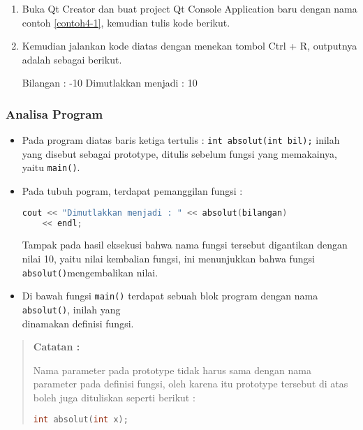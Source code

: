 \begin{enumerate}

\item
  Buka Qt Creator dan buat project Qt Console Application baru dengan
  nama contoh \ref{contoh4-1}, kemudian tulis kode berikut.



\item
  Kemudian jalankan kode diatas dengan menekan tombol Ctrl + R, outputnya
  adalah sebagai berikut.
  \begin{lcverbatim}
Bilangan : -10
Dimutlakkan menjadi : 10
  \end{lcverbatim}
\end{enumerate}

\subsubsection*{Analisa Program }

\begin{itemize}

\item
  Pada program diatas baris ketiga tertulis :
  \texttt{int\ absolut(int\ bil);} inilah yang disebut sebagai
  prototype, ditulis sebelum fungsi yang memakainya, yaitu
  \texttt{main()}.\\
\item
  Pada tubuh pogram, terdapat pemanggilan fungsi :


\begin{lstlisting}[language=c++, numbers=none]
	cout << "Dimutlakkan menjadi : " << absolut(bilangan)
	<< endl;
\end{lstlisting}

Tampak pada hasil eksekusi bahwa nama fungsi tersebut digantikan dengan
nilai 10, yaitu nilai kembalian fungsi, ini menunjukkan bahwa fungsi
\texttt{absolut()}mengembalikan nilai.


\item
  Di bawah fungsi \texttt{main()} terdapat sebuah blok program dengan
  nama \texttt{absolut()}, inilah yang\\
  dinamakan definisi fungsi.

\end{itemize}
\begin{quotation}
 {\LARGE {}} 	 \textbf{Catatan :}
		
		Nama parameter pada prototype tidak
		harus sama dengan nama parameter pada definisi fungsi, oleh karena itu
		prototype tersebut di atas boleh juga dituliskan seperti berikut :
		
\begin{lstlisting}[language=c++, numbers=none]
int absolut(int x);
\end{lstlisting}
	
	 
\end{quotation}


